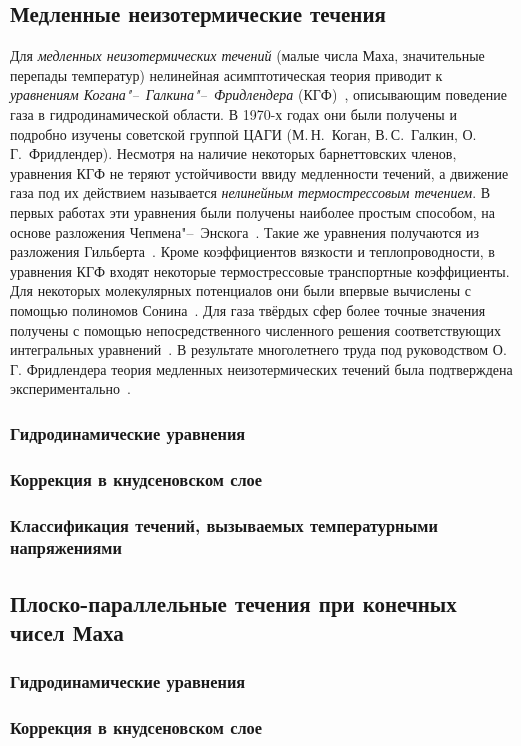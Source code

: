 \subsection{Медленные неизотермические течения}

Для \emph{медленных неизотермических течений} (малые числа Маха, значительные перепады температур)
нелинейная асимптотическая теория приводит к \emph{уравнениям Когана"--~Галкина"--~Фридлендера} (КГФ)~\cite{Kogan1976},
описывающим поведение газа в гидродинамической области.
В 1970-х годах они были получены и подробно изучены советской группой ЦАГИ
(М.\,Н.~Коган, В.\,С.~Галкин, О.\,Г.~Фридлендер).
Несмотря на наличие некоторых барнеттовских членов,
уравнения КГФ не теряют устойчивости ввиду медленности течений,
а движение газа под их действием называется \emph{нелинейным термострессовым течением}.
В первых работах эти уравнения были получены наиболее простым способом,
на основе разложения Чепмена"--~Энскога~\cite{Kogan1970, Kogan1971}.
Такие же уравнения получаются из разложения Гильберта~\cite{Galkin1974}.
Кроме коэффициентов вязкости и теплопроводности, в уравнения КГФ входят некоторые
термострессовые транспортные коэффициенты. Для некоторых молекулярных потенциалов они
были впервые вычислены с помощью полиномов Сонина~\cite{Burnett1935, Chapman1960}.
Для газа твёрдых сфер более точные значения получены с помощью
непосредственного численного решения соответствующих интегральных уравнений~\cite{Sone1996}.
В результате многолетнего труда под руководством О.\,Г. Фридлендера теория медленных неизотермических течений
была подтверждена экспериментально~\cite{Friedlander1997, Friedlander2003}.



\subsubsection{Гидродинамические уравнения}
\subsubsection{Коррекция в кнудсеновском слое}
\subsubsection{Классификация течений, вызываемых температурными напряжениями}

\subsection{Плоско-параллельные течения при конечных чисел Маха}

\subsubsection{Гидродинамические уравнения}
\subsubsection{Коррекция в кнудсеновском слое}

\clearpage
